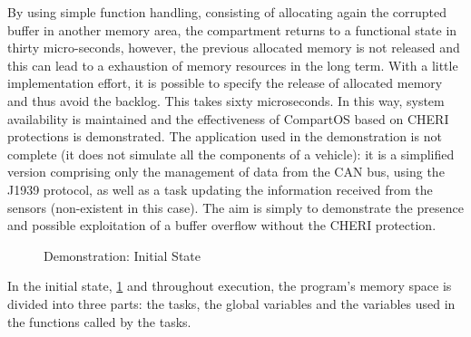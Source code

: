 \documentclass[a4paper, 11pt]{article}
\begin{document}
By using simple function handling, consisting of allocating again the corrupted buffer in another memory area, the compartment returns to a functional state in thirty micro-seconds, however, the previous allocated memory is not released and this can lead to a exhaustion of memory resources in the long term. With a little implementation effort, it is possible to specify the release of allocated memory and thus avoid the backlog. This takes sixty microseconds. In this way, system availability is maintained and the effectiveness of CompartOS based on CHERI protections is demonstrated.
The application used in the demonstration is not complete (it does not simulate all the components of a vehicle): it is a simplified version comprising only the management of data from the CAN bus, using the J1939 protocol, as well as a task updating the information received from the sensors (non-existent in this case). The aim is simply to demonstrate the presence and possible exploitation of a buffer overflow without the CHERI protection.

\newcommand{\drawstack}[3]{
        \draw (#1,#2) rectangle (#1+4,#2+#3);   
        \foreach \v in {1, ..., #3}{
                \draw[-] (#1,\v+#2) -- (#1+4,#2+\v);
        }
}
\newcommand{\drawdemostack}[2]{
        \drawstack{#1}{#2}{4};
        \drawstack{#1}{#2+5}{3};

        \node at (#1+2,#2+0.5) {...};
        \node at (2+#1,#2+7.5) {...};
        \node at (2+#1,6.5+#2) {global buffer};
        \node at (2+#1,1.5+#2) {vulnerable buffer};
        \node at (2+#1,#2+5.5) {...};
}
\begin{figure}
        \begin{center}
        \end{center}
        \caption{Demonstration: Initial State} 
		\label{fig:demo_init}

\end{figure}
In the initial state, \ref{fig:demo_init} and throughout execution, the program's memory space is divided into three parts: the tasks, the global variables and the variables used in the functions called by the tasks.
\end{document}
